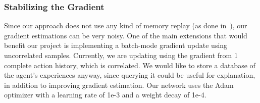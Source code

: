 

\subsubsection{Stabilizing the Gradient}

Since our approach does not use any kind of memory replay (as done in~\cite{pytorchTut}), our gradient estimations can be very noisy.
One of the main extensions that would benefit our project is implementing a batch-mode gradient update using uncorrelated samples.
Currently, we are updating using the gradient from 1 complete action history, which is correlated.
We would like to store a database of the agent's experiences anyway, since querying it could be useful for explanation, in addition to improving gradient estimation. 
Our network uses the Adam optimizer with a learning rate of 1e-3 and a weight decay of 1e-4.